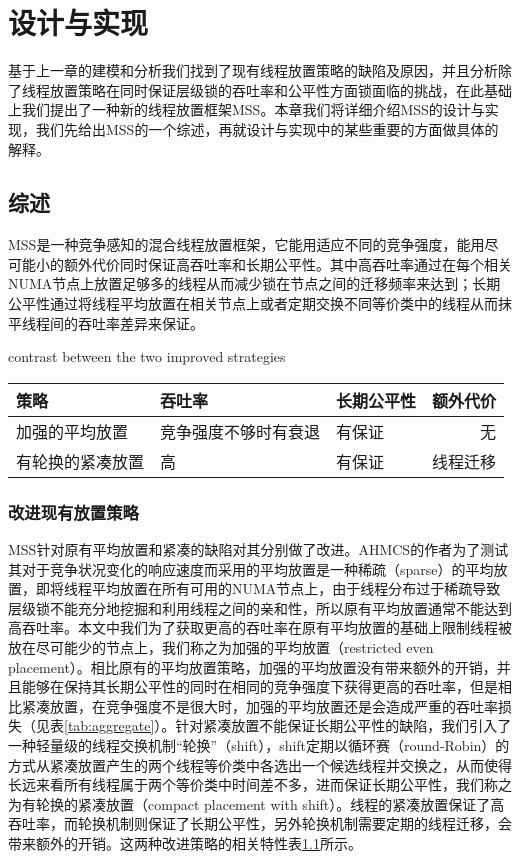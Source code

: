 \chapter{设计与实现}
\label{chap:faq}
基于上一章的建模和分析我们找到了现有线程放置策略的缺陷及原因，并且分析除了线程放置策略在同时保证层级锁的吞吐率和公平性方面锁面临的挑战，在此基础上我们提出了一种新的线程放置框架MSS。本章我们将详细介绍MSS的设计与实现，我们先给出MSS的一个综述，再就设计与实现中的某些重要的方面做具体的解释。

\section{综述}
MSS是一种竞争感知的混合线程放置框架，它能用适应不同的竞争强度，能用尽可能小的额外代价同时保证高吞吐率和长期公平性。其中高吞吐率通过在每个相关NUMA节点上放置足够多的线程从而减少锁在节点之间的迁移频率来达到；长期公平性通过将线程平均放置在相关节点上或者定期交换不同等价类中的线程从而抹平线程间的吞吐率差异来保证。

\begin{table}[!hpb]
  \centering
    {contrast between the two improved strategies}
  \label{tab:contrast}
  \begin{tabular}{@{}lllr@{}} \toprule
    策略             & 吞吐率 & 长期公平性 & 额外代价 \\ \midrule
    加强的平均放置   & 竞争强度不够时有衰退 & 有保证  & 无\\
    有轮换的紧凑放置 & 高 & 有保证  & 线程迁移\\
  \end{tabular}
\end{table}

\subsection{改进现有放置策略}
MSS针对原有平均放置和紧凑的缺陷对其分别做了改进。AHMCS的作者为了测试其对于竞争状况变化的响应速度而采用的平均放置是一种稀疏（sparse）的平均放置，即将线程平均放置在所有可用的NUMA节点上，由于线程分布过于稀疏导致层级锁不能充分地挖掘和利用线程之间的亲和性，所以原有平均放置通常不能达到高吞吐率。本文中我们为了获取更高的吞吐率在原有平均放置的基础上限制线程被放在尽可能少的节点上，我们称之为加强的平均放置（restricted even placement）。相比原有的平均放置策略，加强的平均放置没有带来额外的开销，并且能够在保持其长期公平性的同时在相同的竞争强度下获得更高的吞吐率，但是相比紧凑放置，在竞争强度不是很大时，加强的平均放置还是会造成严重的吞吐率损失（见表\ref{tab:aggregate}）。针对紧凑放置不能保证长期公平性的缺陷，我们引入了一种轻量级的线程交换机制“轮换”（shift），shift定期以循环赛（round-Robin）的方式从紧凑放置产生的两个线程等价类中各选出一个候选线程并交换之，从而使得长远来看所有线程属于两个等价类中时间差不多，进而保证长期公平性，我们称之为有轮换的紧凑放置（compact placement with shift）。线程的紧凑放置保证了高吞吐率，而轮换机制则保证了长期公平性，另外轮换机制需要定期的线程迁移，会带来额外的开销。这两种改进策略的相关特性表\ref{tab:contrast}所示。

